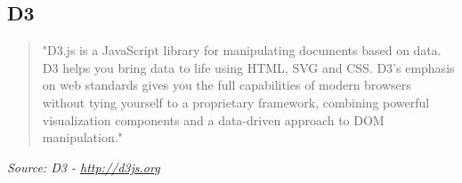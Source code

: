 \subsection{D3}
\begin{quote}
"D3.js is a JavaScript library for manipulating documents based on data. D3 helps you bring data to life using HTML, SVG and CSS. D3's emphasis on web standards gives you the full capabilities of modern browsers without tying yourself to a proprietary framework, combining powerful visualization components and a data-driven approach to DOM manipulation."
\end{quote}
\textit{Source: D3 - \url{http://d3js.org}}


